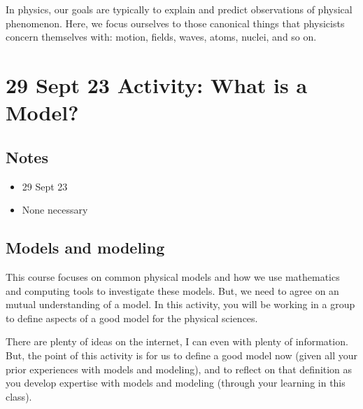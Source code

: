 \documentclass[letterpaper,10pt,english]{jupyterBook}
\begin{document}
\sphinxAtStartPar
In physics, our goals are typically to explain and predict observations of physical phenomenon. Here, we focus ourselves to those canonical things that physicists concern themselves with: motion, fields, waves, atoms, nuclei, and so on.

\sphinxstepscope


\chapter{29 Sept 23 \sphinxhyphen{} Activity: What is a Model?}
\label{\detokenize{content/1_mechanics/modeling/activity-what_is_a_model:sept-23-activity-what-is-a-model}}\label{\detokenize{content/1_mechanics/modeling/activity-what_is_a_model::doc}}

\section{Notes}
\label{\detokenize{content/1_mechanics/modeling/activity-what_is_a_model:notes}}\begin{itemize}
\item {} 
\sphinxAtStartPar
{} 29 Sept 23

\item {} 
\sphinxAtStartPar
{} None necessary

\end{itemize}


\section{Models and modeling}
\label{\detokenize{content/1_mechanics/modeling/activity-what_is_a_model:models-and-modeling}}
\sphinxAtStartPar
This course focuses on common physical models and how we use mathematics and computing tools to investigate these models. But, we need to agree on an mutual understanding of a model. In this activity, you will be working in a group to define aspects of a good model for the physical sciences.

\sphinxAtStartPar
There are plenty of ideas on the internet, I can even  with plenty of information. But, the point of this activity is for us to define a good model now (given all your prior experiences with models and modeling), and to reflect on that definition as you develop expertise with models and modeling (through your learning in this class).
\end{document}
